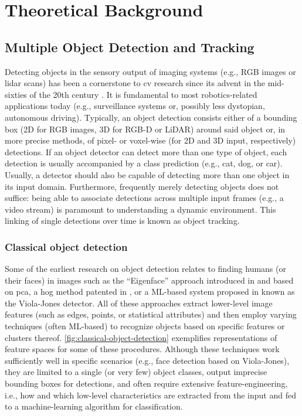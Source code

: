 \documentclass[headsepline, hidelinks, footsepline, footinclude=false, oneside, fontsize=11pt, paper=a4, listof=totoc, bibliography=totoc]{scrbook}
\begin{document}
\chapter{Theoretical Background \label{theoretical-background}}
\label{sec:org87931b0}
\section{Multiple Object Detection and Tracking \label{modat}}
\label{sec:orgd7d93ac}
   Detecting objects in the sensory output of imaging systems (e.g., RGB images or \gls{lidar} scans) has been a cornerstone to \gls{cv} research since its advent in the mid-sixties of the 20th century \cite{papert1966summer}. It is fundamental to most robotics-related applications today (e.g., surveillance systems or, possibly less dystopian, autonomous driving). Typically, an object detection consists either of a bounding box
 (2D for RGB images, 3D for RGB-D or LiDAR) around said object or, in more precise methods, of pixel- or voxel-wise (for 2D and 3D input, respectively) detections. 
If an object detector can detect more than one type of object, each detection is usually accompanied by a class prediction (e.g., cat, dog, or car). Usually, a detector should also be capable of detecting more than
one object in its input domain. 
Furthermore, frequently merely detecting objects does not suffice: being able to associate detections across multiple input frames (e.g., a video stream) is paramount to understanding a dynamic environment.
This linking of single detections over time is known as object tracking.

\subsection{Classical object detection}
\label{sec:orgd57420f}
    Some of the earliest research on object detection relates to finding humans (or their faces) in images such as the ``Eigenface'' approach introduced in \cite{sirovichLowdimensionalProcedureCharacterization1987a} and based on \gls{pca}, 
a \gls{hog} method patented in \cite{mcconnellMethodApparatusPattern}, or a ML-based system proposed in \cite{violaRobustRealtimeFace2004} known as the Viola-Jones detector. 
All of these approaches extract lower-level image features (such as edges, points, or statistical attributes) and then employ varying techniques (often ML-based) 
to recognize objects based on specific features or clusters thereof.
\cref{fig:classical-object-detection} exemplifies representations of feature spaces for some of these procedures.
Although these techniques work sufficiently well in specific scenarios (e.g., face detection based on Viola-Jones), they 
are limited to a single (or very few) object classes, output imprecise bounding boxes for detections, and often require extensive feature-engineering, 
i.e., how and which low-level characteristics are extracted from the input and fed to a machine-learning algorithm for classification.
\end{document}
